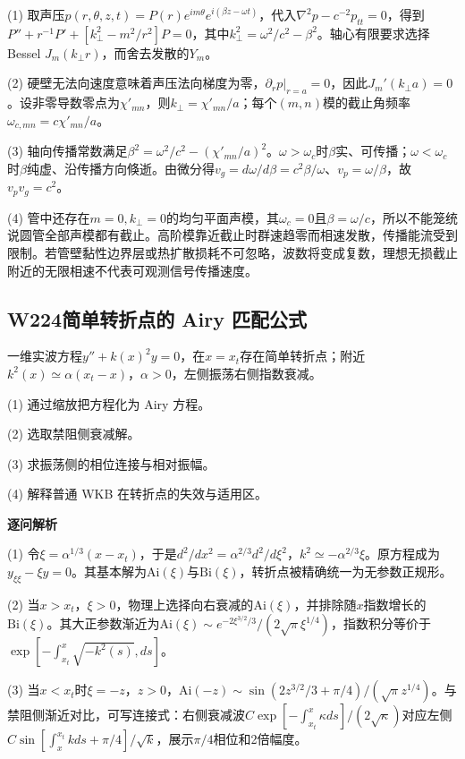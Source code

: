 (1) 取声压$p(r,\theta,z,t)=P(r)e^{im\theta}e^{i(\beta z-\omega t)}$，代入$\nabla^2p-c^{-2}p_{tt}=0$，得到$P''+r^{-1}P'+[k_\perp^2-m^2/r^2]P=0$，其中$k_\perp^2=\omega^2/c^2-\beta^2$。轴心有限要求选择Bessel $J_m(k_\perp r)$，而舍去发散的$Y_m$。

(2) 硬壁无法向速度意味着声压法向梯度为零，$\partial_rp|_{r=a}=0$，因此$J_m'(k_\perp a)=0$。设非零导数零点为$\chi'_{mn}$，则$k_\perp=\chi'_{mn}/a$；每个$(m,n)$模的截止角频率$\omega_{c,mn}=c\chi'_{mn}/a$。

(3) 轴向传播常数满足$\beta^2=\omega^2/c^2-(\chi'_{mn}/a)^2$。$\omega>\omega_c$时$\beta$实、可传播；$\omega<\omega_c$时$\beta$纯虚、沿传播方向倏逝。由微分得$v_g=d\omega/d\beta=c^2\beta/\omega$、$v_p=\omega/\beta$，故$v_pv_g=c^2$。

(4) 管中还存在$m=0,k_\perp=0$的均匀平面声模，其$\omega_c=0$且$\beta=\omega/c$，所以不能笼统说圆管全部声模都有截止。高阶模靠近截止时群速趋零而相速发散，传播能流受到限制。若管壁黏性边界层或热扩散损耗不可忽略，波数将变成复数，理想无损截止附近的无限相速不代表可观测信号传播速度。

\par\medskip

\subsection*{W224\quad 简单转折点的 Airy 匹配公式}

一维实波方程$y''+k(x)^2y=0$，在$x=x_t$存在简单转折点；附近$k^2(x)\simeq\alpha(x_t-x)$，$\alpha>0$，左侧振荡右侧指数衰减。

(1) 通过缩放把方程化为 Airy 方程。

(2) 选取禁阻侧衰减解。

(3) 求振荡侧的相位连接与相对振幅。

(4) 解释普通 WKB 在转折点的失效与适用区。

\par\textbf{逐问解析}

(1) 令$\xi=\alpha^{1/3}(x-x_t)$，于是$d^2/dx^2=\alpha^{2/3}d^2/d\xi^2$，$k^2\simeq-\alpha^{2/3}\xi$。原方程成为$y_{\xi\xi}-\xi y=0$。其基本解为$\mathrm{Ai}(\xi)$与$\mathrm{Bi}(\xi)$，转折点被精确统一为无参数正规形。

(2) 当$x>x_t$，$\xi>0$，物理上选择向右衰减的$\mathrm{Ai}(\xi)$，并排除随$x$指数增长的$\mathrm{Bi}(\xi)$。其大正参数渐近为$\mathrm{Ai}(\xi)\sim e^{-2\xi^{3/2}/3}/(2\sqrt\pi\xi^{1/4})$，指数积分等价于$\exp[-\int_{x_t}^{x}\sqrt{-k^2(s)},ds]$。

(3) 当$x<x_t$时$\xi=-z$，$z>0$，$\mathrm{Ai}(-z)\sim\sin(2z^{3/2}/3+\pi/4)/(\sqrt\pi z^{1/4})$。与禁阻侧渐近对比，可写连接式：右侧衰减波$C\exp[-\int_{x_t}^x\kappa ds]/(2\sqrt\kappa)$对应左侧$C\sin[\int_x^{x_t}k ds+\pi/4]/\sqrt{k}$，展示$\pi/4$相位和2倍幅度。

